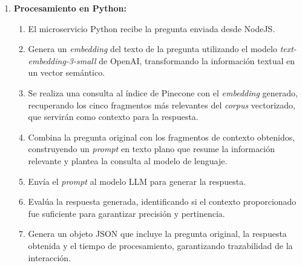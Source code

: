 \begin{enumerate}
\begin{itemize}
\begin{enumerate}
                              \item \textbf{Procesamiento en Python:}
                                    \begin{enumerate}
                                          \item El microservicio Python recibe la pregunta enviada desde NodeJS.
                                          \item Genera un \textit{embedding} del texto de la pregunta utilizando el modelo
                                                \textit{text-embedding-3-small} de OpenAI, transformando la información textual
                                                en un vector semántico.
                                          \item Se realiza una consulta al índice de Pinecone con el \textit{embedding}
                                                generado, recuperando los cinco fragmentos más relevantes del \textit{corpus}
                                                vectorizado, que servirán como contexto para la respuesta.
                                          \item Combina la pregunta original con los fragmentos de contexto obtenidos,
                                                construyendo un \textit{prompt} en texto plano que resume la información
                                                relevante y plantea la consulta al modelo de lenguaje.
                                          \item Envía el \textit{prompt} al modelo LLM para generar la respuesta.
                                          \item Evalúa la respuesta generada, identificando si el contexto proporcionado fue
                                                suficiente para garantizar precisión y pertinencia.
                                          \item Genera un objeto JSON que incluye la pregunta original, la respuesta obtenida y
                                                el tiempo de procesamiento, garantizando trazabilidad de la interacción.
                                    \end{enumerate}


\end{enumerate}
\end{itemize}
\end{enumerate}
